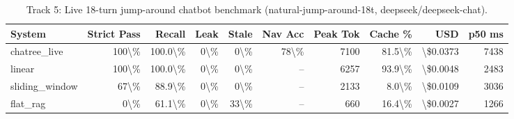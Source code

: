 \begin{table}[t]
\centering
\small
\begin{tabular}{lrrrrrrrrr}
\toprule
\textbf{System} & \textbf{Strict Pass} & \textbf{Recall} & \textbf{Leak} & \textbf{Stale} & \textbf{Nav Acc} & \textbf{Peak Tok} & \textbf{Cache \%} & \textbf{USD} & \textbf{p50 ms} \\
\midrule
chatree\_live & 100\textbackslash{}\% & 100.0\textbackslash{}\% & 0\textbackslash{}\% & 0\textbackslash{}\% & 78\textbackslash{}\% & 7100 & 81.5\textbackslash{}\% & \textbackslash{}\$0.0373 & 7438 \\
linear & 100\textbackslash{}\% & 100.0\textbackslash{}\% & 0\textbackslash{}\% & 0\textbackslash{}\% & -- & 6257 & 93.9\textbackslash{}\% & \textbackslash{}\$0.0048 & 2483 \\
sliding\_window & 67\textbackslash{}\% & 88.9\textbackslash{}\% & 0\textbackslash{}\% & 0\textbackslash{}\% & -- & 2133 & 8.0\textbackslash{}\% & \textbackslash{}\$0.0109 & 3036 \\
flat\_rag & 0\textbackslash{}\% & 61.1\textbackslash{}\% & 0\textbackslash{}\% & 33\textbackslash{}\% & -- & 660 & 16.4\textbackslash{}\% & \textbackslash{}\$0.0027 & 1266 \\
\bottomrule
\end{tabular}
\caption{Track 5: Live 18-turn jump-around chatbot benchmark (natural-jump-around-18t, deepseek/deepseek-chat).}
\label{tab:jump_around_live}
\end{table}
